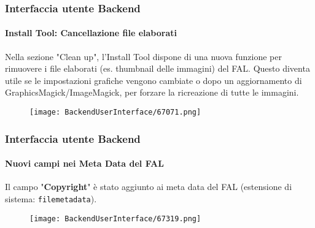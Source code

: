 \begin{frame}[fragile]
	\frametitle{Interfaccia utente Backend}
	\framesubtitle{Install Tool: Cancellazione file elaborati}

	Nella sezione "Clean up", l'Install Tool dispone di una nuova funzione per rimuovere
	i file elaborati (es. thumbnail delle immagini) del FAL.\newline
	Questo diventa utile se le impostazioni grafiche vengono cambiate o dopo un aggiornamento di
	GraphicsMagick/ImageMagick, per forzare la ricreazione di tutte le immagini.

	\begin{figure}
		\texttt{[image: BackendUserInterface/67071.png]}
	\end{figure}

\end{frame}

\begin{frame}[fragile]
	\frametitle{Interfaccia utente Backend}
	\framesubtitle{Nuovi campi nei Meta Data del FAL}

	Il campo "\textbf{Copyright}" è stato aggiunto ai meta data del FAL
	(estensione di sistema: \texttt{filemetadata}).

	\begin{figure}
		\texttt{[image: BackendUserInterface/67319.png]}
	\end{figure}

\end{frame}

